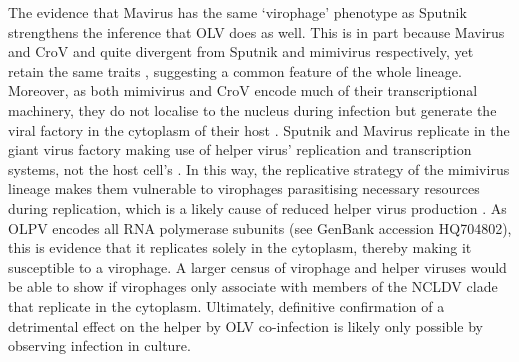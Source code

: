 The evidence that Mavirus has the same `virophage' phenotype as Sputnik strengthens the inference that \ac{OLV} does as well.
This is in part because Mavirus and \ac{CroV} and quite divergent from Sputnik and mimivirus respectively, yet retain the same traits \cite{Fischer2010, Fischer2011a}, suggesting a common feature of the whole lineage.
Moreover, as both mimivirus and \ac{CroV} encode much of their transcriptional machinery, they do not localise to the nucleus during infection but generate the viral factory in the cytoplasm of their host \cite{LaScola2008, Fischer2011a}.
Sputnik and Mavirus replicate in the giant virus factory making use of helper virus' replication and transcription systems, not the host cell's \cite{LaScola2008, Claverie2009, Fischer2011a}.
In this way, the replicative strategy of the mimivirus lineage makes them vulnerable to virophages parasitising necessary resources during replication, which is a likely cause of reduced helper virus production \cite{Claverie2009, Fischer2011a, Fischer2011b}.
As \ac{OLPV} encodes all \textsc{RNA} polymerase subunits (see GenBank accession HQ704802), this is evidence that it replicates solely in the cytoplasm, thereby making it susceptible to a virophage.
A larger census of virophage and helper viruses would be able to show if virophages only associate with members of the \ac{NCLDV} clade that replicate in the cytoplasm.
Ultimately, definitive confirmation of a detrimental effect on the helper by \ac{OLV} co-infection is likely only possible by observing infection in culture.

